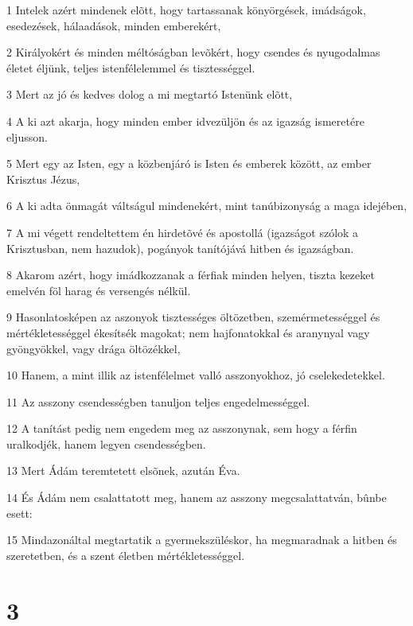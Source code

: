 \par 1 Intelek azért mindenek elõtt, hogy tartassanak könyörgések, imádságok, esedezések, hálaadások, minden emberekért,
\par 2 Királyokért és minden méltóságban levõkért, hogy csendes és nyugodalmas életet éljünk, teljes istenfélelemmel és tisztességgel.
\par 3 Mert az jó és kedves dolog a mi megtartó Istenünk elõtt,
\par 4 A ki azt akarja, hogy minden ember idvezüljön és az igazság ismeretére eljusson.
\par 5 Mert egy az Isten, egy a közbenjáró is Isten és emberek között, az ember Krisztus Jézus,
\par 6 A ki adta önmagát váltságul mindenekért, mint tanúbizonyság a maga idejében,
\par 7 A mi végett rendeltettem én hirdetõvé és apostollá (igazságot szólok a Krisztusban, nem hazudok), pogányok tanítójává hitben és igazságban.
\par 8 Akarom azért, hogy imádkozzanak a férfiak minden helyen, tiszta kezeket emelvén föl harag és versengés nélkül.
\par 9 Hasonlatosképen az aszonyok tisztességes öltözetben, szemérmetességgel és mértékletességgel ékesítsék magokat; nem hajfonatokkal és aranynyal vagy gyöngyökkel, vagy drága öltözékkel,
\par 10 Hanem, a mint illik az istenfélelmet valló asszonyokhoz, jó cselekedetekkel.
\par 11 Az asszony csendességben tanuljon teljes engedelmességgel.
\par 12 A tanítást pedig nem engedem meg az asszonynak, sem hogy a férfin uralkodjék,  hanem legyen csendességben.
\par 13 Mert Ádám teremtetett elsõnek, azután Éva.
\par 14 És Ádám nem csalattatott meg, hanem az asszony megcsalattatván, bûnbe esett:
\par 15 Mindazonáltal megtartatik a gyermekszüléskor, ha megmaradnak a hitben és szeretetben, és a szent életben mértékletességgel.

\chapter{3}

